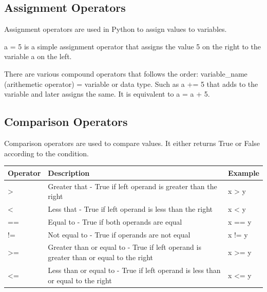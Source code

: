 \documentclass[../main.tex]{subfiles}
\begin{document}
\subsection{Assignment Operators}
Assignment operators are used in Python to assign values to variables.

a = 5 is a simple assignment operator that assigns the value 5 on the right to the variable a on the left.

There are various compound operators that follows the order: variable\_name (arithemetic operator) = variable or data type.  Such as a += 5 that adds to the variable and later assigns the same. It is equivalent to a = a + 5.

\subsection{Comparison Operators} 
Comparison operators are used to compare values. It either returns True or False according to the condition. 
\begin{table}[h]
\begin{small}
\centering
\noindent{}
 \noindent \begin{tabular}{|p{}|p{}| p{}| }
  \hline
Operator& Description & Example  \\ \hline
> & 	Greater that - True if left operand is greater than the right &	x > y\\ \hline
< &	Less that - True if left operand is less than the right &	x < y\\ \hline
== 	& Equal to - True if both operands are equal &	x == y\\ \hline
!= &	Not equal to - True if operands are not equal &	x != y\\ \hline
>= 	& Greater than or equal to - True if left operand is greater than or equal to the right &	x >= y\\ \hline
<= 	& Less than or equal to - True if left operand is less than or equal to the right 	& x <= y\\ \hline
\end{tabular}
  \label{tab:comparison_operators}
  \end{small}
\end{table} 
\end{document}

